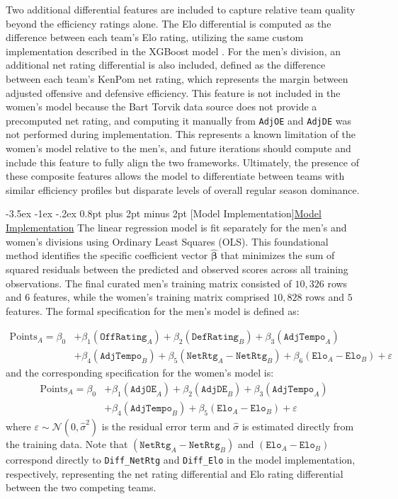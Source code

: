 \documentclass[12pt,leqno]{article}\usepackage[pdftex]{graphicx}\usepackage[dvipsnames]{xcolor}
\makeatletter
\renewcommand\subsubsection{\@startsection {subsubsection}{1}{\z@}%
{-3.5ex \@plus -1ex \@minus -.2ex}%
{0.8pt plus 2pt minus 2pt}%
{\normalfont}}
\newcommand{\usubsubsection}[1]{\subsubsection[#1]{\normalfont\normalfont\underline{#1}}}%
\theoremstyle{remark}
\makeatother
\begin{document}
Two additional differential features are included to capture relative team quality beyond the efficiency ratings alone. The Elo differential is computed as the difference between each team's Elo rating, utilizing the same custom implementation described in the XGBoost model \cite{haupts_elo}. For the men's division, an additional net rating differential is also included, defined as the difference between each team's KenPom net rating, which represents the margin between adjusted offensive and defensive efficiency. This feature is not included in the women's model because the Bart Torvik data source does not provide a precomputed net rating, and computing it manually from \texttt{AdjOE} and \texttt{AdjDE} was not performed during implementation. This represents a known limitation of the women's model relative to the men's, and future iterations should compute and include this feature to fully align the two frameworks. Ultimately, the presence of these composite features allows the model to differentiate between teams with similar efficiency profiles but disparate levels of overall regular season dominance.

\usubsubsection{Model Implementation}
The linear regression model is fit separately for the men's and women's divisions using Ordinary Least Squares (OLS). This foundational method identifies the specific coefficient vector $\hat{\boldsymbol{\beta}}$ that minimizes the sum of squared residuals between the predicted and observed scores across all training observations. The final curated men's training matrix consisted of $10,326$ rows and $6$ features, while the women's training matrix comprised $10,828$ rows and $5$ features. The formal specification for the men's model is defined as:

\begin{equation}
\begin{split}
\text{Points}_A = \beta_0 &+ \beta_1(\mathtt{OffRating}_A) + \beta_2(\mathtt{DefRating}_B) + \beta_3(\mathtt{AdjTempo}_A) \\
&+ \beta_4(\mathtt{AdjTempo}_B) + \beta_5(\mathtt{NetRtg}_A - \mathtt{NetRtg}_B) + \beta_6(\mathtt{Elo}_A - \mathtt{Elo}_B) + \varepsilon
\end{split}
\end{equation}
and the corresponding specification for the women's model is:
\begin{equation}
\begin{split}
\text{Points}_A = \beta_0 &+ \beta_1(\mathtt{AdjOE}_A) + \beta_2(\mathtt{AdjDE}_B) + \beta_3(\mathtt{AdjTempo}_A) \\
&+ \beta_4(\mathtt{AdjTempo}_B) + \beta_5(\mathtt{Elo}_A - \mathtt{Elo}_B) + \varepsilon
\end{split}
\end{equation}
where $\varepsilon \sim \mathcal{N}(0, \hat{\sigma}^2)$ is the residual error term and $\hat{\sigma}$ is estimated directly from the training data. Note that $(\mathtt{NetRtg}_A - \mathtt{NetRtg}_B)$ and  $(\mathtt{Elo}_A - \mathtt{Elo}_B)$ correspond directly to  \texttt{Diff\_NetRtg} and \texttt{Diff\_Elo} in the model implementation, respectively, representing the net rating differential and Elo rating differential between the two competing teams.
\end{document}
